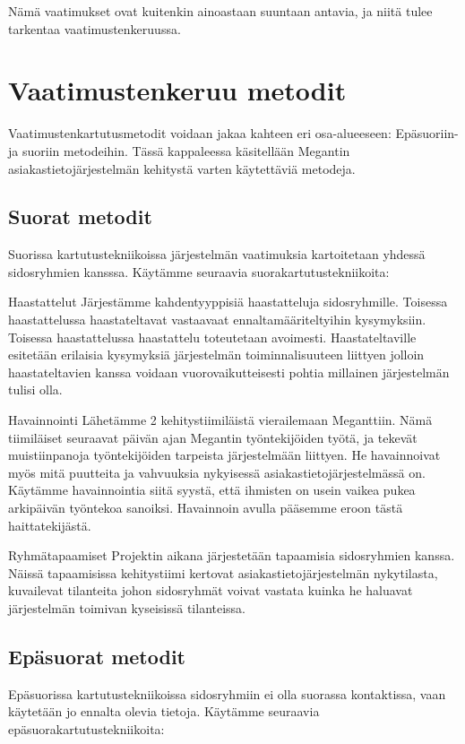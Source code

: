Nämä vaatimukset ovat kuitenkin ainoastaan suuntaan antavia, ja niitä tulee tarkentaa vaatimustenkeruussa. 





\section{Vaatimustenkeruu metodit}
Vaatimustenkartutusmetodit voidaan jakaa kahteen eri osa-alueeseen: Epäsuoriin- ja suoriin metodeihin.
Tässä kappaleessa käsitellään Megantin asiakastietojärjestelmän kehitystä varten käytettäviä metodeja.


\subsection{Suorat metodit}
Suorissa kartutustekniikoissa järjestelmän vaatimuksia kartoitetaan yhdessä sidosryhmien kansssa.
Käytämme seuraavia suorakartutustekniikoita:

Haastattelut
Järjestämme kahdentyyppisiä haastatteluja sidosryhmille. Toisessa haastattelussa haastateltavat vastaavaat ennaltamääriteltyihin kysymyksiin. 
Toisessa haastattelussa haastattelu toteutetaan avoimesti. Haastateltaville esitetään erilaisia kysymyksiä järjestelmän toiminnalisuuteen liittyen jolloin
haastateltavien kanssa voidaan vuorovaikutteisesti pohtia millainen järjestelmän tulisi olla.

Havainnointi
Lähetämme 2 kehitystiimiläistä vierailemaan  Meganttiin. Nämä tiimiläiset seuraavat päivän ajan Megantin työntekijöiden työtä, ja tekevät 
muistiinpanoja työntekijöiden tarpeista järjestelmään liittyen. He havainnoivat myös mitä puutteita ja vahvuuksia nykyisessä asiakastietojärjestelmässä on.
Käytämme havainnointia siitä syystä, että ihmisten on usein vaikea pukea arkipäivän työntekoa sanoiksi. Havainnoin avulla pääsemme eroon tästä haittatekijästä.


Ryhmätapaamiset 
Projektin aikana järjestetään tapaamisia sidosryhmien kanssa. Näissä tapaamisissa kehitystiimi kertovat asiakastietojärjestelmän nykytilasta, kuvailevat tilanteita 
johon sidosryhmät voivat vastata kuinka he haluavat järjestelmän toimivan kyseisissä tilanteissa.


\subsection{Epäsuorat metodit}
Epäsuorissa kartutustekniikoissa sidosryhmiin ei olla suorassa kontaktissa, vaan käytetään jo ennalta olevia tietoja.
Käytämme seuraavia epäsuorakartutustekniikoita:

